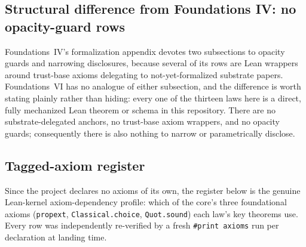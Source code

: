 \documentclass[11pt]{article}
\newcommand{\FVI}{Foundations~VI}
\newcommand{\FoundIV}{Foundations~IV}
\theoremstyle{definition}
\begin{document}
\subsection{Structural difference from Foundations IV: no opacity-guard rows}\label{subsec:opacity-guard-pattern}

\FoundIV's formalization appendix devotes two subsections to opacity guards and narrowing
disclosures, because several of its rows are Lean wrappers around trust-base axioms delegating to
not-yet-formalized substrate papers. \FVI{} has no analogue of either subsection, and the difference
is worth stating plainly rather than hiding: every one of the thirteen laws here is a direct, fully
mechanized Lean theorem or schema in this repository. There are no substrate-delegated anchors, no
trust-base axiom wrappers, and no opacity guards; consequently there is also nothing to narrow or
parametrically disclose.

\subsection{Tagged-axiom register}\label{subsec:tagged-axiom-register}

Since the project declares no axioms of its own, the register below is the genuine Lean-kernel
axiom-dependency profile: which of the core's three foundational axioms (\texttt{propext},
\texttt{Classical.choice}, \texttt{Quot.sound}) each law's key theorems use. Every row was
independently re-verified by a fresh \texttt{\#print axioms} run per declaration at landing time.
\end{document}
